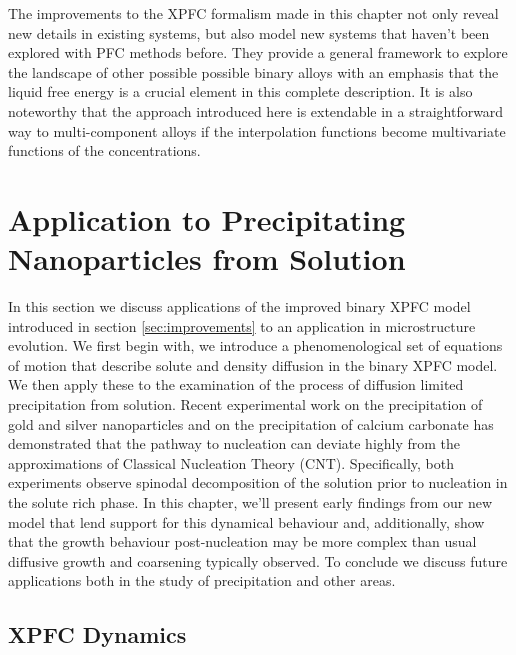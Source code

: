 \documentclass[showkeys, prb, reprint]{revtex4-1}
\begin{document}
The improvements to the XPFC formalism made in this chapter not only reveal new
details in existing systems, but also model new systems that haven't been
explored with PFC methods before. They provide a general framework to explore
the landscape of other possible possible binary alloys with an emphasis that
the liquid free energy is a crucial element in this complete description. It is
also noteworthy that the approach introduced here is extendable in a
straightforward way to multi-component alloys if the interpolation functions
become multivariate functions of the concentrations.

\section{Application to Precipitating Nanoparticles from Solution} %

In this section we discuss applications of the improved binary XPFC model
introduced in section \ref{sec:improvements} to an application in
microstructure evolution.  We first begin with, we introduce  a
phenomenological set of equations of motion that describe solute and density
diffusion in the binary XPFC model. We then apply these to the examination of
the process of diffusion limited precipitation from solution.  Recent
experimental work on the precipitation of gold and silver nanoparticles
\cite{LOH17} and on the precipitation of calcium carbonate \cite{WALLACE13} has
demonstrated that the pathway to nucleation can deviate highly from the
approximations of Classical Nucleation Theory (CNT).  Specifically, both
experiments observe spinodal decomposition of the solution prior to nucleation
in the solute rich phase. In this chapter, we'll present early findings from
our new model that lend support for this dynamical behaviour and, additionally,
show that the growth behaviour post-nucleation may be more complex than usual
diffusive growth and coarsening typically observed.  To conclude we discuss
future applications both in the study of precipitation and other areas.

\subsection{XPFC Dynamics} %
\end{document}
